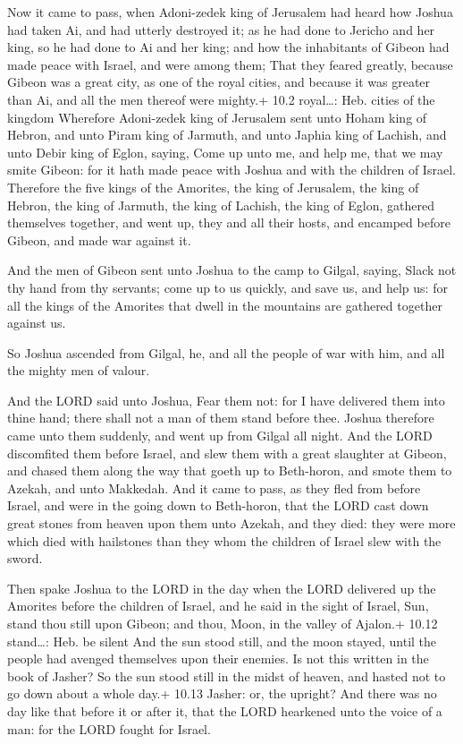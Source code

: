  Now it came to pass, when Adoni-zedek king of Jerusalem had
heard how Joshua had taken Ai, and had utterly destroyed it; as he had
done to Jericho and her king, so he had done to Ai and her king; and how
the inhabitants of Gibeon had made peace with Israel, and were among
them;  That they feared greatly, because Gibeon was a great
city, as one of the royal cities, and because it was greater than Ai,
and all the men thereof were mighty.+ 10.2 royal\ldots: Heb. cities of
the kingdom  Wherefore Adoni-zedek king of Jerusalem sent
unto Hoham king of Hebron, and unto Piram king of Jarmuth, and unto
Japhia king of Lachish, and unto Debir king of Eglon, saying,
 Come up unto me, and help me, that we may smite Gibeon: for
it hath made peace with Joshua and with the children of Israel.
 Therefore the five kings of the Amorites, the king of
Jerusalem, the king of Hebron, the king of Jarmuth, the king of Lachish,
the king of Eglon, gathered themselves together, and went up, they and
all their hosts, and encamped before Gibeon, and made war against it.

 And the men of Gibeon sent unto Joshua to the camp to
Gilgal, saying, Slack not thy hand from thy servants; come up to us
quickly, and save us, and help us: for all the kings of the Amorites
that dwell in the mountains are gathered together against us.

 So Joshua ascended from Gilgal, he, and all the people of
war with him, and all the mighty men of valour.

 And the LORD said unto Joshua, Fear them not: for I have
delivered them into thine hand; there shall not a man of them stand
before thee.  Joshua therefore came unto them suddenly, and
went up from Gilgal all night.  And the LORD discomfited
them before Israel, and slew them with a great slaughter at Gibeon, and
chased them along the way that goeth up to Beth-horon, and smote them to
Azekah, and unto Makkedah.  And it came to pass, as they
fled from before Israel, and were in the going down to Beth-horon, that
the LORD cast down great stones from heaven upon them unto Azekah, and
they died: they were more which died with hailstones than they whom the
children of Israel slew with the sword.

 Then spake Joshua to the LORD in the day when the LORD
delivered up the Amorites before the children of Israel, and he said in
the sight of Israel, Sun, stand thou still upon Gibeon; and thou, Moon,
in the valley of Ajalon.+ 10.12 stand\ldots: Heb. be silent
 And the sun stood still, and the moon stayed, until the
people had avenged themselves upon their enemies. Is not this written in
the book of Jasher? So the sun stood still in the midst of heaven, and
hasted not to go down about a whole day.+ 10.13 Jasher: or, the upright?
 And there was no day like that before it or after it, that
the LORD hearkened unto the voice of a man: for the LORD fought for
Israel.

